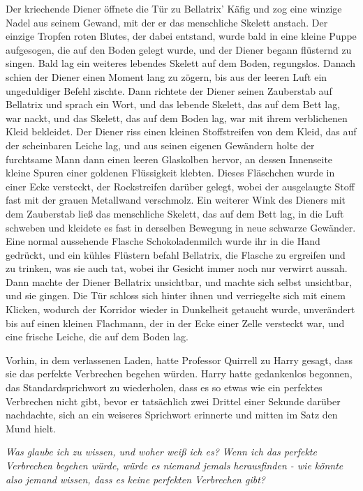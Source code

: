 Der kriechende Diener öffnete die Tür zu Bellatrix' Käfig und zog eine winzige
Nadel aus seinem Gewand, mit der er das menschliche Skelett anstach. Der einzige
Tropfen roten Blutes, der dabei entstand, wurde bald in eine kleine Puppe
aufgesogen, die auf den Boden gelegt wurde, und der Diener begann flüsternd zu
singen. Bald lag ein weiteres lebendes Skelett auf dem Boden, regungslos. Danach
schien der Diener einen Moment lang zu zögern, bis aus der leeren Luft ein
ungeduldiger Befehl zischte. Dann richtete der Diener seinen Zauberstab auf
Bellatrix und sprach ein Wort, und das lebende Skelett, das auf dem Bett lag,
war nackt, und das Skelett, das auf dem Boden lag, war mit ihrem verblichenen
Kleid bekleidet. Der Diener riss einen kleinen Stoffstreifen von dem Kleid, das
auf der scheinbaren Leiche lag, und aus seinen eigenen Gewändern holte der
furchtsame Mann dann einen leeren Glaskolben hervor, an dessen Innenseite kleine
Spuren einer goldenen Flüssigkeit klebten. Dieses Fläschchen wurde in einer Ecke
versteckt, der Rockstreifen darüber gelegt, wobei der ausgelaugte Stoff fast mit
der grauen Metallwand verschmolz. Ein weiterer Wink des Dieners mit dem
Zauberstab ließ das menschliche Skelett, das auf dem Bett lag, in die Luft
schweben und kleidete es fast in derselben Bewegung in neue schwarze Gewänder.
Eine normal aussehende Flasche Schokoladenmilch wurde ihr in die Hand gedrückt,
und ein kühles Flüstern befahl Bellatrix, die Flasche zu ergreifen und zu
trinken, was sie auch tat, wobei ihr Gesicht immer noch nur verwirrt aussah.
Dann machte der Diener Bellatrix unsichtbar, und machte sich selbst unsichtbar,
und sie gingen. Die Tür schloss sich hinter ihnen und verriegelte sich mit einem
Klicken, wodurch der Korridor wieder in Dunkelheit getaucht wurde, unverändert
bis auf einen kleinen Flachmann, der in der Ecke einer Zelle versteckt war, und
eine frische Leiche, die auf dem Boden lag.

Vorhin, in dem verlassenen Laden, hatte Professor Quirrell zu Harry gesagt, dass
sie das perfekte Verbrechen begehen würden. Harry hatte gedankenlos begonnen,
das Standardsprichwort zu wiederholen, dass es so etwas wie ein perfektes
Verbrechen nicht gibt, bevor er tatsächlich zwei Drittel einer Sekunde darüber
nachdachte, sich an ein weiseres Sprichwort erinnerte und mitten im Satz den
Mund hielt.

\emph{Was glaube ich zu wissen, und woher weiß ich es? Wenn ich das perfekte
Verbrechen begehen würde, würde es niemand jemals herausfinden - wie könnte
also jemand wissen, dass es keine perfekten Verbrechen gibt?}

